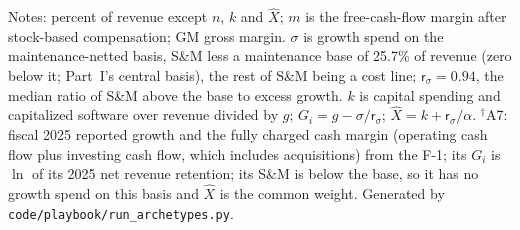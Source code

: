 \begin{table}[t]
\centering
\caption{Archetypes: cell medians of 2023--25 non-acquisition core firm-years and their calibrated Part~I states (Assumption~\ref{ass:playbook-calib}, $\alpha$ the engine's default)}\label{tab:playbook-archetypes}
\scriptsize
\setlength{\tabcolsep}{3pt}

\smallskip
\begin{minipage}{0.98\linewidth}\scriptsize
Notes: percent of revenue except $n$, $k$ and $\hat X$; $m$ is the free-cash-flow margin after stock-based compensation; GM gross margin. $\sigma$ is growth spend on the maintenance-netted basis, S\&M less a maintenance base of 25.7\% of revenue (zero below it; Part~I's central basis), the rest of S\&M being a cost line; $\mathsf r_\sigma=0.94$, the median ratio of S\&M above the base to excess growth. $k$ is capital spending and capitalized software over revenue divided by $g$; $G_i=g-\sigma/\mathsf r_\sigma$; $\hat X=k+\mathsf r_\sigma/\alpha$. $^\dagger$A7: fiscal 2025 reported growth and the fully charged cash margin (operating cash flow plus investing cash flow, which includes acquisitions) from the F-1; its $G_i$ is $\ln$ of its 2025 net revenue retention; its S\&M is below the base, so it has no growth spend on this basis and $\hat X$ is the common weight. Generated by \texttt{code/playbook/run\_archetypes.py}.
\end{minipage}
\end{table}
